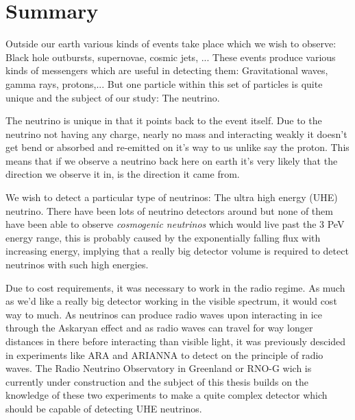 \documentclass[11pt,a4paper,faculty=we,language=en,doctype=report]{cls/ugent-doc}
\renewcommand{\ULthickness}{2pt} %
\begin{document}

\maketitle
\renewcommand{\ULthickness}{1pt}

\shipout\null
\newpage
\chapter*{Summary}
Outside our earth various kinds of events take place which we wish to 
observe: Black hole outbursts, supernovae, cosmic jets, ...
These events produce various kinds of messengers which are useful in
detecting them: Gravitational waves, gamma rays, protons,...
But one particle within this set of particles is quite unique and
the subject of our study: The neutrino. 

The neutrino is unique in that it points back to the event itself.
Due to the neutrino not having any charge, nearly no mass and 
interacting weakly it doesn't get bend or absorbed and re-emitted 
on it's way to us unlike say the proton. This means that if we observe
a neutrino back here on earth it's very likely that the direction we observe
it in, is the direction it came from.

We wish to detect a particular type of neutrinos: The ultra high energy (UHE)
neutrino.  There have been lots of neutrino detectors around but none of them
have been able to observe \textit{cosmogenic neutrinos} which would live past
the 3 PeV energy range, this is probably caused by the exponentially falling
flux with increasing energy, implying that a really big detector volume is
required to detect neutrinos with such high energies. 

Due to cost requirements, it was necessary to work in the radio regime.  As
much as we'd like a really big detector working in the visible spectrum, it
would cost way to much. As neutrinos can produce radio waves upon interacting
in ice through the Askaryan effect and as radio waves can travel for way longer
distances in there before interacting than visible light, it was previously
descided in experiments like ARA and ARIANNA to detect on the principle of
radio waves. The Radio Neutrino Observatory in Greenland or RNO-G wich is
currently under construction and the subject of this thesis builds on the
knowledge of these two experiments to make a quite complex detector which
should be capable of detecting UHE neutrinos.
\end{document}
